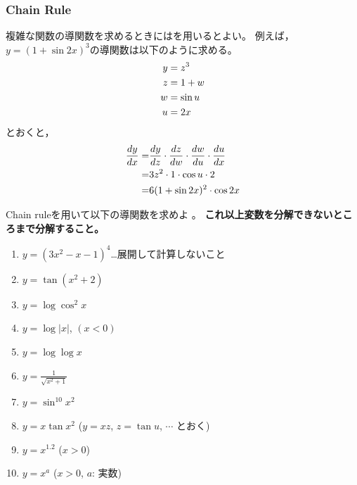 \documentclass[twocolumn,11pt]{jarticle}
\begin{document}
\subsubsection{Chain Rule}
複雑な関数の導関数を求めるときにはを用いるとよい。
例えば，$y=(1+\sin 2x)^3$の導関数は以下のように求める。
\begin{align}
  y&=z^3\notag\\
  z&=1+w\notag\\
  w&=\sin u\notag\\
  u&=2x\notag
\end{align}
とおくと，
\begin{align}
  \frac{dy}{dx}
  =&\frac{dy}{dz}\cdot\frac{dz}{dw}\cdot\frac{dw}{du}\cdot\frac{du}{dx}\notag\\
  =&3z^2\cdot 1 \cdot \cos u\cdot 2\notag\\
  =&6(1+\sin 2x)^2\cdot \cos 2x \notag
\end{align}

\exercise
Chain ruleを用いて以下の導関数を求めよ
。
\textbf{これ以上変数を分解できないところまで分解すること。}

\begin{enumerate}
  \item \label{ditem:3x2-x-1}$y=(3x^2-x-1)^4$…展開して計算しないこと
  \item \label{ditem:tan(x2+2)}$y=\tan(x^2+2)$
  \item \label{ditem:logcos2x}$y=\log\cos^2x$
  \item \label{ditem:log|x|}$y=\log|x|$, $(x<0)$
  \item \label{ditem:loglogx}$y=\log\log x$
  \item \label{ditem:1/sqrt(x2+1)}$\displaystyle y=\frac{1}{\sqrt{x^2+1}}$
  \item \label{ditem:sin10x2}$y=\sin^{10}x^2$
  \item \label{ditem:xtan(x2)}$y=x\tan x^2$\quad
    ($y=xz$, $z=\tan u$, $\cdots$ とおく)
  \item \label{ditem:x^1.2}$y=x^{1.2}$ ($x>0$)
  \item \label{ditem:x^a}$y=x^a$ ($x>0$, $a$: 実数)
\end{enumerate}
\end{document}
